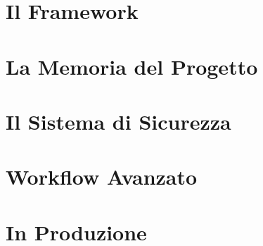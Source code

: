 \documentclass[10pt,twoside,openright]{book}
\begin{document}
\frontmatter

\tableofcontents





\mainmatter

\part{Il Framework}




\part{La Memoria del Progetto}




\part{Il Sistema di Sicurezza}






\part{Workflow Avanzato}





\part{In Produzione}

\end{document}
